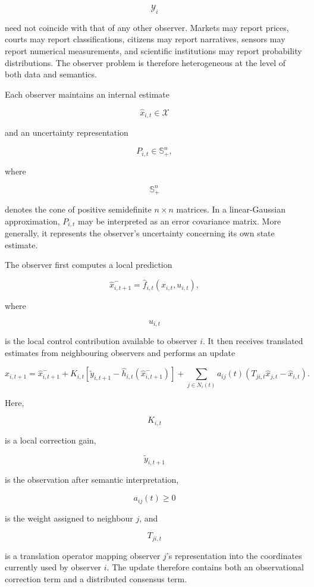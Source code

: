 \documentclass[12pt,a4paper]{article}
\begin{document}
\[
\mathcal{Y}_i
\]

need not coincide with that of any other observer. Markets may report prices, courts may report classifications, citizens may report narratives, sensors may report numerical measurements, and scientific institutions may report probability distributions. The observer problem is therefore heterogeneous at the level of both data and semantics.

Each observer maintains an internal estimate

\[
\hat{x}_{i,t}\in\mathcal{X}
\]

and an uncertainty representation

\[
P_{i,t}\in\mathbb{S}_{+}^{n},
\]

where

\[
\mathbb{S}_{+}^{n}
\]

denotes the cone of positive semidefinite \(n\times n\) matrices. In a linear-Gaussian approximation, \(P_{i,t}\) may be interpreted as an error covariance matrix. More generally, it represents the observer's uncertainty concerning its own state estimate.

The observer first computes a local prediction

\[
\hat{x}^{-}_{i,t+1}
=
\hat{f}_{i,t}
\left(
\hat{x}_{i,t},
u_{i,t}
\right),
\]

where

\[
u_{i,t}
\]

is the local control contribution available to observer \(i\). It then receives translated estimates from neighbouring observers and performs an update

\[
\hat{x}_{i,t+1}
=
\hat{x}^{-}_{i,t+1}
+
K_{i,t}
\left[
\tilde{y}_{i,t+1}
-
\hat{h}_{i,t}
\left(
\hat{x}^{-}_{i,t+1}
\right)
\right]
+
\sum_{j\in N_i(t)}
a_{ij}(t)
\left(
T_{ji,t}\hat{x}_{j,t}
-
\hat{x}_{i,t}
\right).
\]

Here,

\[
K_{i,t}
\]

is a local correction gain,

\[
\tilde{y}_{i,t+1}
\]

is the observation after semantic interpretation,

\[
a_{ij}(t)\geq 0
\]

is the weight assigned to neighbour \(j\), and

\[
T_{ji,t}
\]

is a translation operator mapping observer \(j\)'s representation into the coordinates currently used by observer \(i\). The update therefore contains both an observational correction term and a distributed consensus term.
\end{document}
